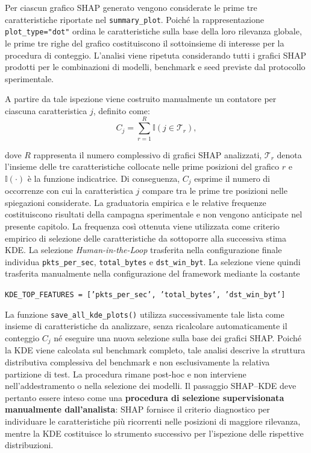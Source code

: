 Per ciascun grafico SHAP generato vengono considerate le prime tre caratteristiche riportate nel \texttt{summary\_plot}. 
Poiché la rappresentazione \texttt{plot\_type="dot"} ordina le caratteristiche sulla base della loro rilevanza globale, le prime tre righe del grafico costituiscono il sottoinsieme di interesse per la procedura di conteggio. 
L'analisi viene ripetuta considerando tutti i grafici SHAP prodotti per le combinazioni di modelli, benchmark e seed previste dal protocollo sperimentale.

A partire da tale ispezione viene costruito manualmente un contatore per ciascuna caratteristica $j$, definito come:
\begin{equation}
C_j =
\sum_{r=1}^{R}
\mathbb{I}\left(j \in \mathcal{T}_r\right),
\label{eq:shap_feature_counter}
\end{equation}

dove $R$ rappresenta il numero complessivo di grafici SHAP analizzati, $\mathcal{T}_r$ denota l'insieme delle tre caratteristiche collocate nelle prime posizioni del grafico $r$ e $\mathbb{I}(\cdot)$ è la funzione indicatrice. 
Di conseguenza, $C_j$ esprime il numero di occorrenze con cui la caratteristica $j$ compare tra le prime tre posizioni nelle spiegazioni considerate.
La graduatoria empirica e le relative frequenze costituiscono risultati della campagna sperimentale e non vengono anticipate nel presente capitolo. La frequenza così ottenuta viene utilizzata come criterio empirico di selezione delle caratteristiche da sottoporre alla successiva stima KDE. 
La selezione \textit{Human-in-the-Loop} trasferita nella configurazione finale individua \texttt{pkts\_per\_sec}, \texttt{total\_bytes} e \texttt{dst\_win\_byt}. 
La selezione viene quindi trasferita manualmente nella configurazione del framework mediante la costante
\begin{center}
    \texttt{KDE\_TOP\_FEATURES = ['pkts\_per\_sec', 'total\_bytes', 'dst\_win\_byt']}    
\end{center}

La funzione \texttt{save\_all\_kde\_plots()} utilizza successivamente tale lista come insieme di caratteristiche da analizzare, senza ricalcolare automaticamente il conteggio $C_j$ né eseguire una nuova selezione sulla base dei grafici SHAP. 
Poiché la KDE viene calcolata sul benchmark completo, tale analisi descrive la struttura distributiva complessiva del benchmark e non esclusivamente la relativa partizione di test. La procedura rimane post-hoc e non interviene nell'addestramento o nella selezione dei modelli.
Il passaggio SHAP--KDE deve pertanto essere inteso come una \textbf{procedura di selezione supervisionata manualmente dall'analista}: SHAP fornisce il criterio diagnostico per individuare le caratteristiche più ricorrenti nelle posizioni di maggiore rilevanza, mentre la KDE costituisce lo strumento successivo per l'ispezione delle rispettive distribuzioni.

